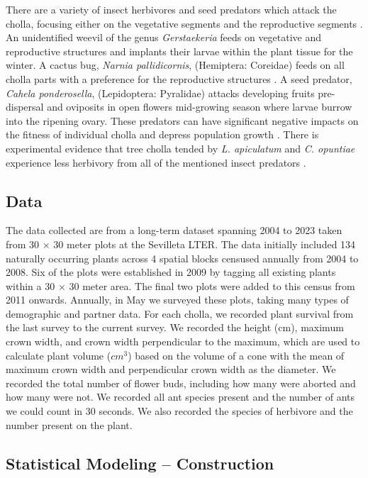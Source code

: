 \documentclass[11pt]{article}
\begin{document}
{{There are a variety of insect herbivores and seed predators which attack the cholla, focusing either on the vegetative segments and the reproductive segments \citep{Mann1969}. 
An unidentified weevil of the genus \textit{Gerstaekeria} feeds on vegetative and reproductive structures and implants their larvae within the plant tissue for the winter. 
A cactus bug, \textit{Narnia pallidicornis}, (Hemiptera: Coreidae) feeds on all cholla parts with a preference for the reproductive structures \citep{Miller2006}.
A seed predator, \textit{Cahela ponderosella}, (Lepidoptera: Pyralidae) attacks developing fruits pre-dispersal and oviposits in open flowers mid-growing season where larvae burrow into the ripening ovary. 
These predators can have significant negative impacts on the fitness of individual cholla and depress population growth \citep{Miller2009}.
There is experimental evidence that tree cholla tended by \textit{L. apiculatum} and \textit{C. opuntiae} experience less herbivory from all of the mentioned insect predators \citep{Miller2007}. 

\subsection*{Data}
	
The data collected are from a long-term dataset spanning 2004 to 2023 taken from 30 $\times$ 30 meter plots at the Sevilleta LTER. 
The data initially included 134 naturally occurring plants across 4 spatial blocks censused annually from 2004 to 2008.
Six of the plots were established in 2009 by tagging all existing plants within a 30 $\times$ 30 meter area. 
The final two plots were added to this census from 2011 onwards. 
Annually, in May we surveyed these plots, taking many types of demographic and partner data. 
For each cholla, we recorded plant survival from the last survey to the current survey. 
We recorded the height (cm), maximum crown width, and crown width perpendicular to the maximum, which are used to calculate plant volume ($cm^3$) based on the volume of a cone with the mean of maximum crown width and perpendicular crown width as the diameter. 
We recorded the total number of flower buds, including how many were aborted and how many were not. We recorded all ant species present and the number of ants we could count in 30 seconds. 
We also recorded the species of herbivore and the number present on the plant.
		
\subsection*{Statistical Modeling -- Construction}
	
}}
\end{document}
